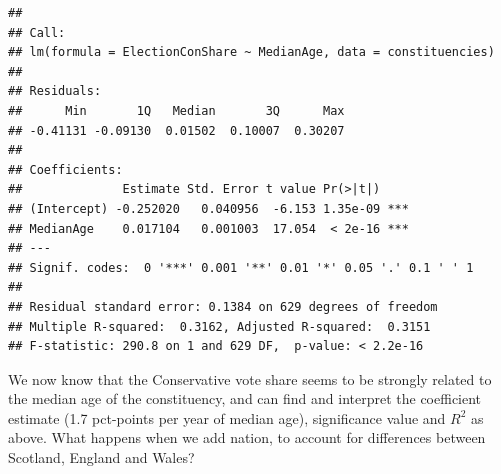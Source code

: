 \documentclass[
]{book}
\newenvironment{Shaded}{\begin{snugshade}}{\end{snugshade}}
\newcommand{\CommentTok}[1]{\textcolor[rgb]{0.56,0.35,0.01}{\textit{#1}}}
\newcommand{\DataTypeTok}[1]{\textcolor[rgb]{0.13,0.29,0.53}{#1}}
\newcommand{\KeywordTok}[1]{\textcolor[rgb]{0.13,0.29,0.53}{\textbf{#1}}}
\newcommand{\NormalTok}[1]{#1}
\newcommand{\OperatorTok}[1]{\textcolor[rgb]{0.81,0.36,0.00}{\textbf{#1}}}
\newcommand{\StringTok}[1]{\textcolor[rgb]{0.31,0.60,0.02}{#1}}
\begin{document}
\begin{Shaded}
\end{Shaded}

\begin{verbatim}
## 
## Call:
## lm(formula = ElectionConShare ~ MedianAge, data = constituencies)
## 
## Residuals:
##      Min       1Q   Median       3Q      Max 
## -0.41131 -0.09130  0.01502  0.10007  0.30207 
## 
## Coefficients:
##              Estimate Std. Error t value Pr(>|t|)    
## (Intercept) -0.252020   0.040956  -6.153 1.35e-09 ***
## MedianAge    0.017104   0.001003  17.054  < 2e-16 ***
## ---
## Signif. codes:  0 '***' 0.001 '**' 0.01 '*' 0.05 '.' 0.1 ' ' 1
## 
## Residual standard error: 0.1384 on 629 degrees of freedom
## Multiple R-squared:  0.3162,	Adjusted R-squared:  0.3151 
## F-statistic: 290.8 on 1 and 629 DF,  p-value: < 2.2e-16
\end{verbatim}

We now know that the Conservative vote share seems to be strongly
related to the median age of the constituency, and can find and
interpret the coefficient estimate (1.7 pct-points per year of median
age), significance value and \(R^2\) as above. What happens when we add
nation, to account for differences between Scotland, England and Wales?
\end{document}
